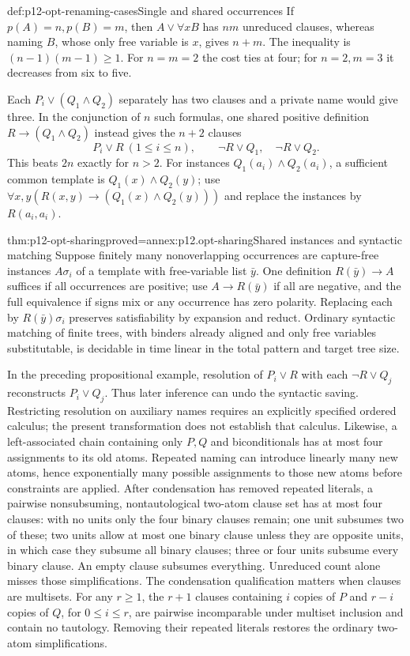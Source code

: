 \begin{hbexample}{def:p12-opt-renaming-cases}{Single and shared occurrences}
If \(p(A)=n,p(B)=m\), then \(A\lor\forall xB\) has \(nm\)
unreduced clauses, whereas naming \(B\), whose only free variable is
\(x\), gives \(n+m\). The inequality is \((n-1)(m-1)\ge1\).
For \(n=m=2\) the cost ties at four; for \(n=2,m=3\) it decreases
from six to five.

Each \(P_i\lor(Q_1\land Q_2)\) separately has two clauses and a
private name would give three. In the conjunction of \(n\) such
formulas, one shared positive definition
\(R\to(Q_1\land Q_2)\) instead gives the \(n+2\) clauses
\[
 P_i\lor R\ (1\le i\le n),\qquad
 \neg R\lor Q_1,\quad\neg R\lor Q_2.
\]
This beats \(2n\) exactly for \(n>2\).
For instances \(Q_1(a_i)\land Q_2(a_i)\), a sufficient common
template is \(Q_1(x)\land Q_2(y)\); use
\(\forall x,y(R(x,y)\to(Q_1(x)\land Q_2(y)))\) and replace the
instances by \(R(a_i,a_i)\).
\end{hbexample}

\begin{hbtheorem}{thm:p12-opt-sharing}{proved=annex:p12.opt-sharing}{Shared instances and syntactic matching}
Suppose finitely many nonoverlapping occurrences are capture-free
instances \(A\sigma_i\) of a template with free-variable list \(\bar y\).
One definition \(R(\bar y)\to A\) suffices if all occurrences are
positive; use \(A\to R(\bar y)\) if all are negative, and the full
equivalence if signs mix or any occurrence has zero polarity.
Replacing each by \(R(\bar y)\sigma_i\) preserves satisfiability
by expansion and reduct.
Ordinary syntactic matching of finite trees, with binders already
aligned and only free variables substitutable, is decidable in time
linear in the total pattern and target tree size.
\end{hbtheorem}

In the preceding propositional example, resolution of \(P_i\lor R\)
with each \(\neg R\lor Q_j\) reconstructs \(P_i\lor Q_j\).
Thus later inference can undo the syntactic saving. Restricting
resolution on auxiliary names requires an explicitly specified ordered
calculus; the present transformation does not establish that calculus.
Likewise, a left-associated chain containing only \(P,Q\) and
biconditionals has at most four assignments to its old atoms.
Repeated naming can introduce linearly many new atoms, hence
exponentially many possible assignments to those new atoms before
constraints are applied. After condensation has removed repeated
literals, a pairwise nonsubsuming, nontautological two-atom clause set
has at most four clauses: with no units only
the four binary clauses remain; one unit subsumes two of these;
two units allow at most one binary clause unless they are opposite
units, in which case they subsume all binary clauses; three or
four units subsume every binary clause. An empty clause subsumes
everything. Unreduced count alone misses those simplifications.
The condensation qualification matters when clauses are multisets.
For any \(r\ge1\), the \(r+1\) clauses containing \(i\) copies of
\(P\) and \(r-i\) copies of \(Q\), for \(0\le i\le r\), are
pairwise incomparable under multiset inclusion and contain no
tautology. Removing their repeated literals restores the ordinary
two-atom simplifications.

